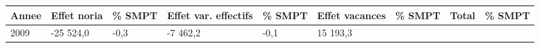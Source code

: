\begin{longtable}[]{@{}lllllllll@{}}
\toprule
\begin{minipage}[b]{0.05\columnwidth}\raggedright
Annee\strut
\end{minipage} & \begin{minipage}[b]{0.10\columnwidth}\raggedright
Effet noria\strut
\end{minipage} & \begin{minipage}[b]{0.06\columnwidth}\raggedright
\% SMPT\strut
\end{minipage} & \begin{minipage}[b]{0.16\columnwidth}\raggedright
Effet var. effectifs\strut
\end{minipage} & \begin{minipage}[b]{0.06\columnwidth}\raggedright
\% SMPT\strut
\end{minipage} & \begin{minipage}[b]{0.12\columnwidth}\raggedright
Effet vacances\strut
\end{minipage} & \begin{minipage}[b]{0.06\columnwidth}\raggedright
\% SMPT\strut
\end{minipage} & \begin{minipage}[b]{0.09\columnwidth}\raggedright
Total\strut
\end{minipage} & \begin{minipage}[b]{0.06\columnwidth}\raggedright
\% SMPT\strut
\end{minipage}\tabularnewline
\midrule
\endhead
\begin{minipage}[t]{0.05\columnwidth}\raggedright
2009\strut
\end{minipage} & \begin{minipage}[t]{0.10\columnwidth}\raggedright
-25 524,0\strut
\end{minipage} & \begin{minipage}[t]{0.06\columnwidth}\raggedright
-0,3\strut
\end{minipage} & \begin{minipage}[t]{0.16\columnwidth}\raggedright
-7 462,2\strut
\end{minipage} & \begin{minipage}[t]{0.06\columnwidth}\raggedright
-0,1\strut
\end{minipage} & \begin{minipage}[t]{0.12\columnwidth}\raggedright
15 193,3\strut
\end{minipage} & \begin{minipage}[t]{0.06\columnwidth}\raggedright

\end{minipage}
\end{longtable}
